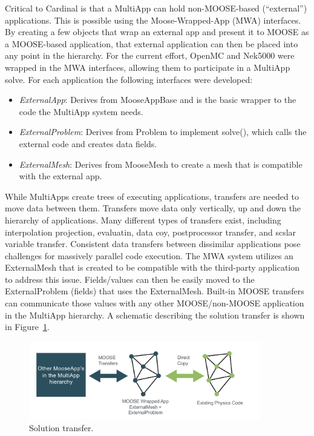 Critical to Cardinal is that a MultiApp can hold non-MOOSE-based (``external'')
applications. This is possible using the Moose-Wrapped-App (MWA) interfaces. By
creating a few objects that wrap an external app and present it to MOOSE as a
MOOSE-based application, that external application can then be placed into any
point in the hierarchy. For the current effort, OpenMC and Nek5000 were wrapped
in the MWA interfaces, allowing them to participate in a MultiApp solve. For
each application the following interfaces were developed: 
\begin{itemize}
    \item \textit{ExternalApp}: Derives from MooseAppBase and is the basic wrapper to the code the MultiApp
    system needs.
    \item \textit{ExternalProblem}: Derives from Problem to implement solve(), which calls the external code and creates data fields.
    \item \textit{ExternalMesh}: Derives from MooseMesh to create a mesh that is compatible with the external app.
\end{itemize}
While MultiApps create trees of executing applications, transfers are needed to move data between them. Transfers move data only vertically, up and down the hierarchy of applications. Many different types of transfers exist, including interpolation projection, evaluatin, data coy, postprocessor transfer, and scslar variable transfer.
Consistent data transfers between dissimilar applications pose challenges for massively parallel code execution.  The MWA system utilizes an ExternalMesh that is created to be compatible with the third-party application to address this issue. Fields/values can then be easily moved to the ExternalProblem (fields) that uses the ExternalMesh. Built-in MOOSE transfers can communicate those values with any other MOOSE/non-MOOSE application in the MultiApp hierarchy. A schematic describing the solution transfer is shown in Figure~\ref{f:moose2}.

\begin{figure}[!h]
\centering
\includegraphics[clip=true,width=0.9\textwidth]{Figures/moose2}
\caption{Solution transfer.}
\label{f:moose2}
\end{figure}

